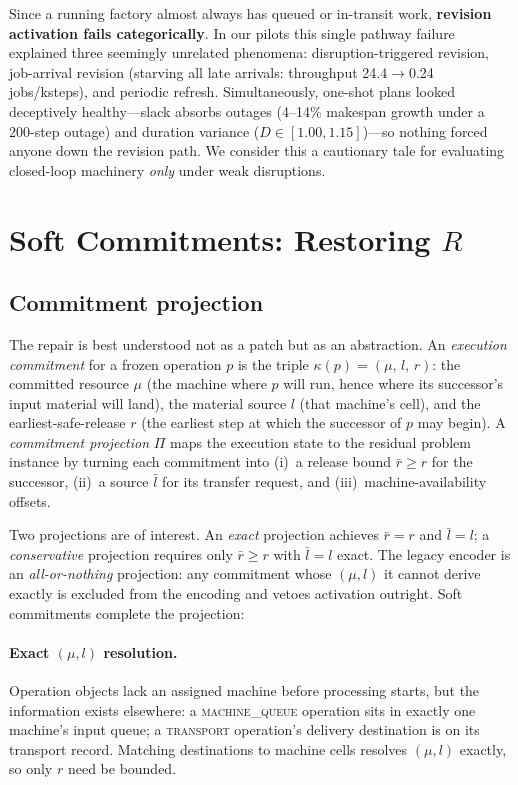 \documentclass[twocolumn]{article}
\begin{document}
Since a running factory almost always has queued or in-transit work,
\textbf{revision activation fails categorically}. In our pilots this
single pathway failure explained three seemingly unrelated phenomena:
disruption-triggered revision, job-arrival revision (starving all late
arrivals: throughput 24.4$\to$0.24 jobs/ksteps), and periodic refresh.
Simultaneously, one-shot plans looked deceptively healthy---slack absorbs
outages (4--14\% makespan growth under a 200-step outage) and duration
variance ($D\in[1.00,1.15]$)---so nothing forced anyone down the
revision path. We consider this a cautionary tale for evaluating
closed-loop machinery \emph{only} under weak disruptions.

\section{Soft Commitments: Restoring $R$}
\label{sec:soft}

\subsection{Commitment projection}
The repair is best understood not as a patch but as an abstraction.
An \emph{execution commitment} for a frozen operation $p$ is the triple
$\kappa(p)=(\mu,\,l,\,r)$: the committed resource $\mu$ (the machine
where $p$ will run, hence where its successor's input material will
land), the material source $l$ (that machine's cell), and the
earliest-safe-release $r$ (the earliest step at which the successor of
$p$ may begin). A \emph{commitment projection}
$\Pi$ maps the execution state to the residual problem instance by
turning each commitment into (i)~a release bound $\bar r\ge r$ for the
successor, (ii)~a source $\bar l$ for its transfer request, and
(iii)~machine-availability offsets.

Two projections are of interest. An \emph{exact} projection achieves
$\bar r=r$ and $\bar l=l$; a \emph{conservative} projection requires only
$\bar r\ge r$ with $\bar l=l$ exact. The legacy encoder is an
\emph{all-or-nothing} projection: any commitment whose $(\mu,l)$ it
cannot derive exactly is excluded from the encoding and vetoes
activation outright. Soft commitments complete the projection:

\paragraph{Exact $(\mu,l)$ resolution.}
Operation objects lack an assigned machine before processing starts,
but the information exists elsewhere: a \textsc{machine\_queue}
operation sits in exactly one machine's input queue; a
\textsc{transport} operation's delivery destination is on its transport
record. Matching destinations to machine cells resolves $(\mu,l)$
exactly, so only $r$ need be bounded.
\end{document}
